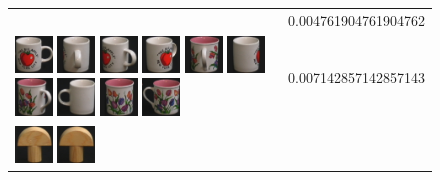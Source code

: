 \begin{figure}[tbp]
\begin{tabular}{m{11cm} | m{3cm} |}
& {\scriptsize 0.004761904761904762}
\\
\includegraphics[width=1cm]{coil/beeld-36.eps}
\includegraphics[width=1cm]{coil/beeld-41.eps}
\includegraphics[width=1cm]{coil/beeld-40.eps}
\includegraphics[width=1cm]{coil/beeld-39.eps}
\includegraphics[width=1cm]{coil/beeld-11.eps}
\includegraphics[width=1cm]{coil/beeld-38.eps}
\includegraphics[width=1cm]{coil/beeld-10.eps}
\includegraphics[width=1cm]{coil/beeld-37.eps}
\includegraphics[width=1cm]{coil/beeld-8.eps}
\includegraphics[width=1cm]{coil/beeld-7.eps}
& {\scriptsize 0.007142857142857143}
\\
\includegraphics[width=1cm]{coil/beeld-0.eps}
\includegraphics[width=1cm]{coil/beeld-1.eps}

\end{tabular}
\end{figure}
